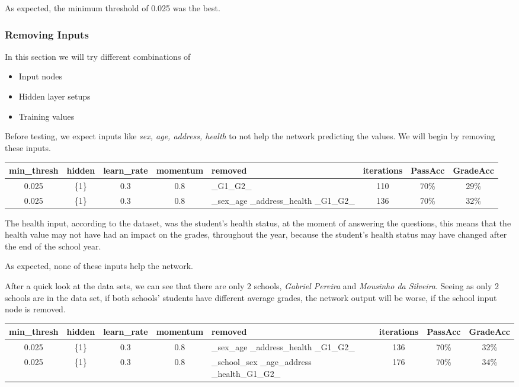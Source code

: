 \documentclass[11pt]{article}
\begin{document}
As expected, the minimum threshold of 0.025 was the best.

\subsubsection{Removing Inputs}
In this section we will try different combinations of
\begin{itemize}
\item Input nodes
\item Hidden layer setups
\item Training values
\end{itemize}

Before testing, we expect inputs like \textit{sex, age, address, health} to not help the network predicting the values. We will begin by removing these inputs.


\begin{tabular}{| c | c | c | c | p{3cm} | c | c | c |}
\hline \textbf{min\_thresh} & \textbf{hidden} & \textbf{learn\_rate} & \textbf{momentum} & \textbf{removed} & \textbf{iterations} & \textbf{PassAcc} & \textbf{GradeAcc}\\
\hline 0.025 & \{1\} & 0.3 & 0.8 & \_G1\_G2\_ & 110 & 70\% & 29\%\\
\hline 0.025 & \{1\} & 0.3 & 0.8 & \_sex\_age \_address\_health \_G1\_G2\_ & 136 & 70\% & 32\%\\
\hline
\end{tabular}

The health input, according to the dataset, was the student's health status, at the moment of answering the questions, this means that the health value may not have had an impact on the grades, throughout the year, because the student's health status may have changed after the end of the school year.

As expected, none of these inputs help the network.
\hfill \break
\hfill \break

After a quick look at the data sets, we can see that there are only 2 schools, \textit{Gabriel Pereira} and \textit{Mousinho da Silveira}. Seeing as only 2 schools are in the data set, if both schools' students have different average grades, the network output will be worse, if the school input node is removed.

\begin{tabular}{| c | c | c | c | p{3cm} | c | c | c |}
\hline \textbf{min\_thresh} & \textbf{hidden} & \textbf{learn\_rate} & \textbf{momentum} & \textbf{removed} & \textbf{iterations} & \textbf{PassAcc} & \textbf{GradeAcc}\\
\hline 0.025 & \{1\} & 0.3 & 0.8 & \_sex\_age \_address\_health \_G1\_G2\_ & 136 & 70\% & 32\%\\
\hline 0.025 & \{1\} & 0.3 & 0.8 & \_school\_sex \_age\_address \_health\_G1\_G2\_ & 176 & 70\% & 34\%\\
\hline
\end{tabular}
\end{document}
